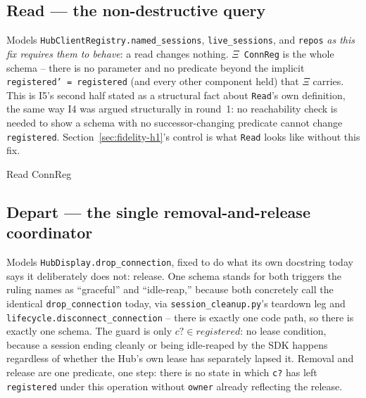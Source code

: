 \documentclass[a4paper,10pt,fleqn]{article}
\begin{document}
\subsection{Read --- the non-destructive query}
\label{sec:read}

Models \texttt{HubClientRegistry.named\_sessions},
\texttt{live\_sessions}, and \texttt{repos} \emph{as this fix requires
them to behave}: a read changes nothing. \texttt{$\Xi$ ConnReg} is the
whole schema -- there is no parameter and no predicate beyond the
implicit \texttt{registered' = registered} (and every other component
held) that \texttt{$\Xi$} carries. This is I5's second half stated as a
structural fact about \texttt{Read}'s own definition, the same way I4 was
argued structurally in round~1: no reachability check is needed to show a
schema with no successor-changing predicate cannot change
\texttt{registered}. Section~\ref{sec:fidelity-h1}'s control is what
\texttt{Read} looks like without this fix.

\begin{schema}{Read}
  \Xi ConnReg
\end{schema}

\subsection{Depart --- the single removal-and-release coordinator}
\label{sec:depart}

Models \texttt{HubDisplay.drop\_connection}, fixed to do what its own
docstring today says it deliberately does not: release. One schema
stands for both triggers the ruling names as ``graceful'' and
``idle-reap,'' because both concretely call the identical
\texttt{drop\_connection} today, via
\texttt{session\_cleanup.py}'s teardown leg and
\texttt{lifecycle.disconnect\_connection} -- there is exactly one code
path, so there is exactly one schema. The guard is only
\texttt{$c? \in registered$}: no lease condition, because a session ending
cleanly or being idle-reaped by the SDK happens regardless of whether the
Hub's own lease has separately lapsed it. Removal and release are one
predicate, one step: there is no state in which \texttt{c?} has left
\texttt{registered} under this operation without \texttt{owner} already
reflecting the release.
\end{document}
